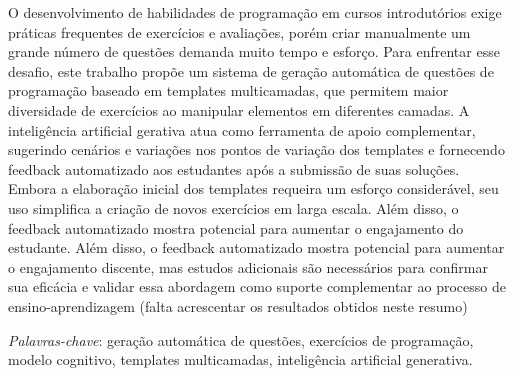 \begin{resumo}
O desenvolvimento de habilidades de programação em cursos introdutórios exige práticas frequentes de exercícios e avaliações, porém criar manualmente um grande número de questões demanda muito tempo e esforço. Para enfrentar esse desafio, este trabalho propõe um sistema de geração automática de questões de programação baseado em templates multicamadas, que permitem maior diversidade de exercícios ao manipular elementos em diferentes camadas. A inteligência artificial gerativa atua como ferramenta de apoio complementar, sugerindo cenários e variações nos pontos de variação dos templates e fornecendo feedback automatizado aos estudantes após a submissão de suas soluções. Embora a elaboração inicial dos templates requeira um esforço considerável, seu uso simplifica a criação de novos exercícios em larga escala. Além disso, o feedback automatizado mostra potencial para aumentar o engajamento do estudante.  Além disso, o feedback automatizado mostra potencial para aumentar o engajamento discente, mas estudos adicionais são necessários para confirmar sua eficácia e validar essa abordagem como suporte complementar ao processo de ensino-aprendizagem  (falta acrescentar os resultados obtidos neste resumo)
 
  \bigbreak

  \noindent
  \textit{Palavras-chave}: geração automática de questões, exercícios de programação, modelo cognitivo, templates multicamadas, inteligência artificial generativa.
\end{resumo}